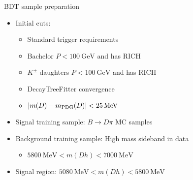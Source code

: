 \documentclass{beamer}
\begin{document}
\begin{frame}{BDT sample preparation}
  \begin{itemize}
    \setlength\itemsep{1.3em}
    \item{Initial cuts:}
    \begin{itemize}
      \item{Standard trigger requirements}
      \item{Bachelor $P < \SI{100}{\giga\eV}$ and has RICH}
      \item{$K^\pm$ daughters $P < \SI{100}{\giga\eV}$ and has RICH}
      \item{DecayTreeFitter convergence}
      \item{$\abs{m(D) - m_\text{PDG}(D)} < \SI{25}{\mega\eV}$}
    \end{itemize}
    \item{Signal training sample: $B\to D\pi$ MC samples}
    \item{Background training sample: High mass sideband in data}
    \begin{itemize}
      \item{$\SI{5800}{\mega\eV} < m(Dh) < \SI{7000}{\mega\eV}$}
    \end{itemize}
    \item{Signal region: $\SI{5080}{\mega\eV} < m(Dh) < \SI{5800}{\mega\eV}$}
  \end{itemize}
\end{frame}
\end{document}
